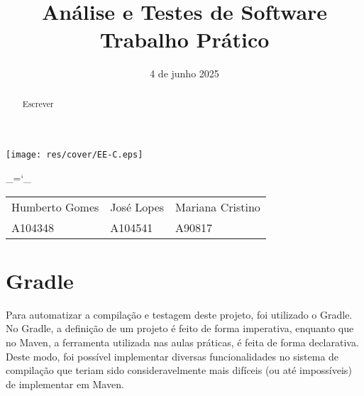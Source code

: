 \documentclass[12pt, a4paper]{article}
\title{\Huge \textbf{Análise e Testes de Software \\ \Large Trabalho Prático}}
\date{4 de junho 2025}
\begin{document}
\begin{center}
    \texttt{[image: res/cover/EE-C.eps]}
\end{center}

\chardef\_=`_
\onehalfspacing
\setlength{\parskip}{\baselineskip}
\setlength{\parindent}{0pt}
\def\arraystretch{1.5}

{\let\newpage\relax\maketitle}
\maketitle
\thispagestyle{empty}

\vspace{\fill}

\begin{adjustwidth}{-2cm}{-2cm} %
    \begin{center}
        \begin{tabular}{>{\centering}p{}
                        >{\centering}p{}
                        >{\centering\arraybackslash}p{}}

            Humberto Gomes & José Lopes & Mariana Cristino \\
            A104348        & A104541    & A90817
        \end{tabular}
    \end{center}
\end{adjustwidth}

\pagebreak

\begin{abstract}
    Escrever
\end{abstract}

\section{Gradle}

Para automatizar a compilação e testagem deste projeto, foi utilizado o Gradle. No Gradle, a
definição de um projeto é feito de forma imperativa, enquanto que no Maven, a ferramenta utilizada
nas aulas práticas, é feita de forma declarativa. Deste modo, foi possível implementar diversas
funcionalidades no sistema de compilação que teriam sido consideravelmente mais difíceis (ou até
impossíveis) de implementar em Maven.
\end{document}
